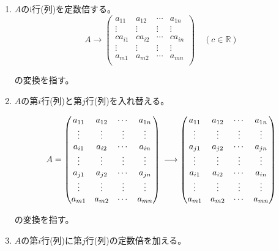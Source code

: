 \documentclass[dvipdfmx,autodetect-engine]{jsarticle}
\theoremstyle{definition}
\begin{document}
\begin{enumerate}
\renewcommand{\labelenumi}{(\arabic{enumi})}
\item $A$のi行(列)を定数倍する。
$$
A \longrightarrow \begin{pmatrix}
a_{11} & a_{12} & \cdots & a_{1n} \\
\vdots & \vdots & \vdots & \vdots \\
ca_{i1} & ca_{i2} & \cdots & ca_{in} \\
\vdots & \vdots & \vdots & \vdots \\
a_{m1} & a_{m2} & \cdots & a_{mn} \\
\end{pmatrix} \quad (c \in \mathbb{R})
$$

の変換を指す。

\item $A$の第$i$行(列)と第$j$行(列)を入れ替える。

$$
A = \begin{pmatrix}
a_{11} & a_{12} & \cdots & a_{1n} \\
\vdots & \vdots & \vdots & \vdots \\
a_{i1} & a_{i2} & \cdots & a_{in} \\
\vdots & \vdots & \vdots & \vdots \\
a_{j1} & a_{j2} & \cdots & a_{jn} \\
\vdots & \vdots & \vdots & \vdots \\
a_{m1} & a_{m2} & \cdots & a_{mn} \\
\end{pmatrix} \\
\longrightarrow \begin{pmatrix}
a_{11} & a_{12} & \cdots & a_{1n} \\
\vdots & \vdots & \vdots & \vdots \\
a_{j1} & a_{j2} & \cdots & a_{jn} \\
\vdots & \vdots & \vdots & \vdots \\
a_{i1} & a_{i2} & \cdots & a_{in} \\
\vdots & \vdots & \vdots & \vdots \\
a_{m1} & a_{m2} & \cdots & a_{mn} \\
\end{pmatrix}
$$

の変換を指す。

\item $A$の第$i$行(列)に第$j$行(列)の定数倍を加える。


\end{enumerate}
\end{document}
